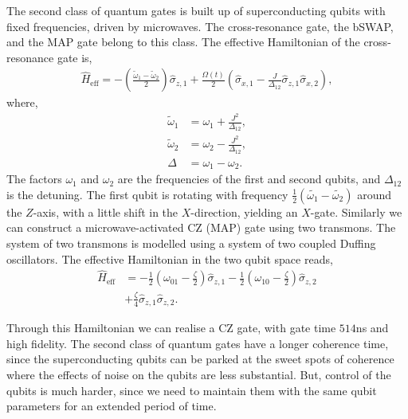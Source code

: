 The second class of quantum gates is built up of superconducting qubits with fixed frequencies, driven by microwaves. The cross-resonance gate, the bSWAP, and the MAP gate belong to this class. The effective Hamiltonian of the cross-resonance gate is,
\begin{align}
\hat{H}_\mathrm{eff} = - \left( \frac{\tilde{\omega}_{1} - \tilde{\omega}_2}{2} \right) \hat\sigma_{z,1} + \frac{\Omega(t)}{2} \left(\hat\sigma_{x,1} - \frac{J}{\Delta_{12}} \hat\sigma_{z,1} \hat\sigma_{x,2} \right),
\end{align}
where,
\begin{align}
	\tilde{\omega}_{1} &= \omega_{1} + \frac{J^{2}}{\Delta_{12}}, \nonumber\\
		\tilde{\omega}_{2} &= \omega_{2} - \frac{J^{2}}{\Delta_{12}}, \nonumber\\
\Delta &= \omega_{1} -\omega_{2}.		
\end{align}
The factors $\omega_{1}$ and $\omega_{2}$ are the frequencies of the first and second qubits, and $\Delta_{12}$ is the detuning. The first qubit is rotating with frequency $\frac{1}{2}(\tilde{\omega_{1}} - \tilde{\omega_{2}})$ around the $Z$-axis, with a little shift in the $X$-direction, yielding an $X$-gate. Similarly we can construct a microwave-activated CZ (MAP) gate using two transmons. The system of two transmons is modelled using a system of two coupled Duffing oscillators. The effective Hamiltonian in the two qubit space reads,
\begin{align}
\hat{H}_\mathrm{eff} &= - \frac{1}{2} \left( \omega_{01} - \frac{\zeta}{2} \right) \hat\sigma_{z,1} - \frac{1}{2} \left( \omega_{10} - \frac{\zeta}{2} \right) \hat\sigma_{z,2} \nonumber\\
&+ \frac{\zeta}{4} \hat\sigma_{z,1} \hat\sigma_{z,2}. 
\end{align}

Through this Hamiltonian we can realise a CZ gate, with gate time $514$ns and high fidelity. The second class of quantum gates have a longer coherence time, since the superconducting qubits can be parked at the sweet spots of coherence where the effects of noise on the qubits are less substantial. But, control of the qubits is much harder, since we need to maintain them with the same qubit parameters for an extended period of time.